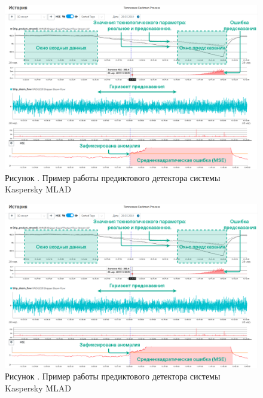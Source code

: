      \begin{figure}
  	\centering
  	\def\svgwidth{\textwidth}
  	\includegraphics[scale=0.6]{images/MLADex.png}
  	\caption*{\gostFont Рисунок \thechaptercntr .\theimagecntr \spc {--} Пример работы предиктового детектора системы Kaspersky MLAD}
  	\label{fig:MLADBlackBox}
  \end{figure} \addtocounter{imagecntr}{1}
  
     \begin{figure}
  	\centering
  	\def\svgwidth{\textwidth}
  	\includegraphics[scale=0.6]{images/MLADex.png}
  	\caption*{\gostFont Рисунок \thechaptercntr .\theimagecntr \spc {--} Пример работы предиктового детектора системы Kaspersky MLAD}
  	\label{fig:MLADBlackBox}
  \end{figure} \addtocounter{imagecntr}{1}
  
